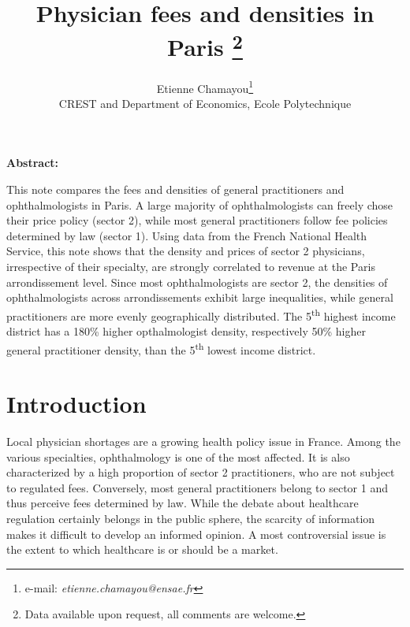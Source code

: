 \documentclass[11pt]{article}
\begin{document}
\title{Physician fees and densities in Paris%
\thanks{Data available upon request, all comments are welcome.%
}}

\author{Etienne Chamayou\thanks{e-mail:
\textit{etienne.chamayou@ensae.fr}}\medskip\\{\normalsize CREST and Department of Economics, Ecole Polytechnique }}
\maketitle

\sloppy%

\onehalfspacing

\textbf{Abstract:}

This note compares the fees and densities of general practitioners and ophthalmologists in Paris. A large majority of ophthalmologists can freely chose their price policy (sector 2), while most general practitioners follow fee policies determined by law (sector 1). Using data from the French National Health Service, this note shows that the density and prices of sector 2 physicians, irrespective of their specialty, are strongly correlated to revenue at the Paris arrondissement level. Since most ophthalmologists are sector 2, the densities of ophthalmologists across arrondissements exhibit large inequalities, while general practitioners are more evenly geographically distributed. The 5\textsuperscript{th} highest income district has a 180\% higher opthalmologist density, respectively 50\% higher general practitioner density, than the 5\textsuperscript{th} lowest income district.

\strut

\pagebreak%
\doublespacing

\section{Introduction}

Local physician shortages are a growing health policy issue in France. Among the various specialties, ophthalmology is one of the most affected. It is also characterized by a high proportion of sector 2 practitioners, who are not subject to regulated fees. Conversely, most general practitioners belong to sector 1 and thus perceive fees determined by law. While the debate about healthcare regulation certainly belongs in the public sphere, the scarcity of information makes it difficult to develop an informed opinion. A most controversial issue is the extent to which healthcare is or should be a market.
\end{document}
